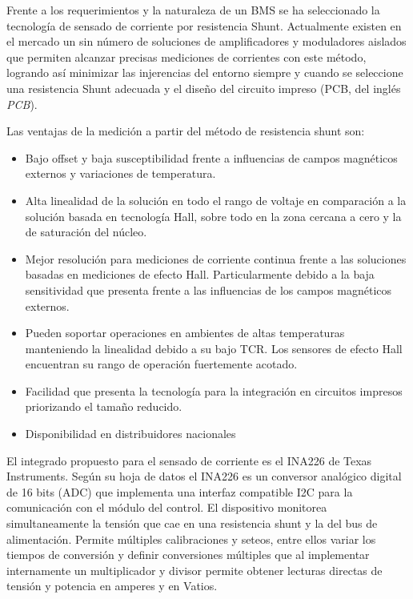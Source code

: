 \documentclass[10pt, a4paper]{report}
\begin{document}
Frente a los requerimientos y la naturaleza de un \acrshort{BMS} se ha
seleccionado la tecnología de sensado de corriente por resistencia Shunt.
Actualmente existen en el mercado un sin número de soluciones de amplificadores
y moduladores aislados que permiten alcanzar precisas mediciones de corrientes
con este método, logrando as\'i minimizar las injerencias del entorno siempre 
y cuando se seleccione una resistencia Shunt adecuada y el diseño del circuito
impreso (\acrshort{PCB}, del ingl\'es \emph{\acrlong{PCB}}).

\noindent Las ventajas de la medición a partir del método de resistencia 
shunt son:

\begin{itemize}
    \item Bajo offset y baja susceptibilidad frente a influencias de campos 
	magnéticos externos y variaciones de temperatura.
    \item Alta linealidad de la solución en todo el rango de voltaje en 
	comparación a la solución basada en tecnología Hall, sobre todo en 
	la zona cercana a cero y la de saturación del n\'ucleo. 
    \item Mejor resolución para mediciones de corriente continua frente a 
	las soluciones basadas en mediciones de efecto Hall. 
	Particularmente debido a la baja sensitividad que presenta frente a 
	las influencias de los campos magnéticos externos.
    \item Pueden soportar operaciones en ambientes de altas temperaturas 
	manteniendo la linealidad debido a su bajo TCR. 
	Los sensores de efecto Hall encuentran su rango de operación 
	fuertemente acotado.
    \item Facilidad que presenta la tecnología para la integración en 
	circuitos impresos priorizando el tamaño reducido.
    \item Disponibilidad en distribuidores nacionales
\end{itemize}

\noindent El integrado propuesto para el sensado de corriente es el INA226 de
Texas Instruments. Seg\'un su hoja de datos \cite{ina226} el INA226 es un 
conversor analógico digital de 16 bits (ADC) que implementa una interfaz 
compatible I2C para la comunicación con el módulo del control. El dispositivo 
monitorea simultaneamente la tensión que cae en una resistencia shunt y la del 
bus de alimentación. Permite múltiples calibraciones y seteos, entre ellos 
variar los tiempos de conversión y definir conversiones múltiples que al 
implementar internamente un multiplicador y divisor permite obtener lecturas 
directas de tensión y potencia en amperes y en Vatios.
\end{document}
